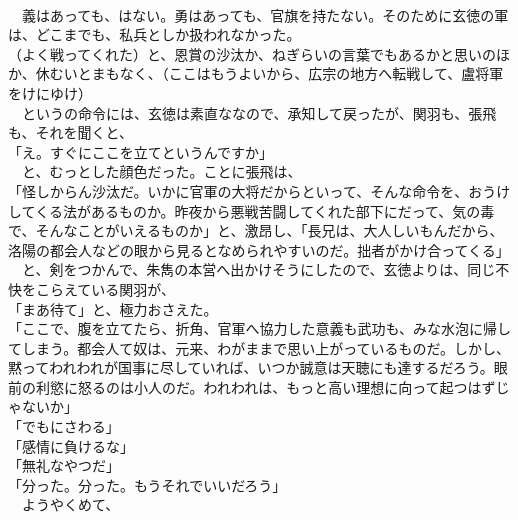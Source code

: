 \documentclass[
  paper=a5,
  fontsize=10pt,
  jafontsize=9.5pt,
  tate,                  %
  open_bracket_pos=nibu, %
]{jlreq}
\begin{document}
\\


　義はあっても、はない。勇はあっても、官旗を持たない。そのために玄徳の軍は、どこまでも、私兵としか扱われなかった。\\


（よく戦ってくれた）と、恩賞の沙汰か、ねぎらいの言葉でもあるかと思いのほか、休むいとまもなく、（ここはもうよいから、広宗の地方へ転戦して、盧将軍をけにゆけ）\\


　というの命令には、玄徳は素直ななので、承知して戻ったが、関羽も、張飛も、それを聞くと、\\


「え。すぐにここを立てというんですか」\\


　と、むっとした顔色だった。ことに張飛は、\\


「怪しからん沙汰だ。いかに官軍の大将だからといって、そんな命令を、おうけしてくる法があるものか。昨夜から悪戦苦闘してくれた部下にだって、気の毒で、そんなことがいえるものか」と、激昂し、「長兄は、大人しいもんだから、洛陽の都会人などの眼から見るとなめられやすいのだ。拙者がかけ合ってくる」\\


　と、剣をつかんで、朱雋の本営へ出かけそうにしたので、玄徳よりは、同じ不快をこらえている関羽が、\\


「まあ待て」と、極力おさえた。\\


「ここで、腹を立てたら、折角、官軍へ協力した意義も武功も、みな水泡に帰してしまう。都会人て奴は、元来、わがままで思い上がっているものだ。しかし、黙ってわれわれが国事に尽していれば、いつか誠意は天聴にも達するだろう。眼前の利慾に怒るのは小人のだ。われわれは、もっと高い理想に向って起つはずじゃないか」\\


「でもにさわる」\\


「感情に負けるな」\\


「無礼なやつだ」\\


「分った。分った。もうそれでいいだろう」\\


　ようやくめて、\\
\end{document}
